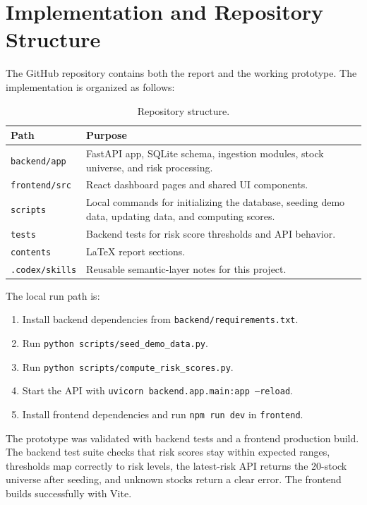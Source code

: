 \section{Implementation and Repository Structure}
\label{sec:implementation}

The GitHub repository contains both the report and the working prototype. The implementation is organized as follows:

\begin{table}[H]
\centering
\begin{tabular}{p{} p{}}
\toprule
\textbf{Path} & \textbf{Purpose} \\
\midrule
\texttt{backend/app} & FastAPI app, SQLite schema, ingestion modules, stock universe, and risk processing. \\
\texttt{frontend/src} & React dashboard pages and shared UI components. \\
\texttt{scripts} & Local commands for initializing the database, seeding demo data, updating data, and computing scores. \\
\texttt{tests} & Backend tests for risk score thresholds and API behavior. \\
\texttt{contents} & LaTeX report sections. \\
\texttt{.codex/skills} & Reusable semantic-layer notes for this project. \\
\bottomrule
\end{tabular}
\caption{Repository structure.}
\label{tab:repo-structure}
\end{table}

The local run path is:

\begin{enumerate}
    \item Install backend dependencies from \texttt{backend/requirements.txt}.
    \item Run \texttt{python scripts/seed\_demo\_data.py}.
    \item Run \texttt{python scripts/compute\_risk\_scores.py}.
    \item Start the API with \texttt{uvicorn backend.app.main:app --reload}.
    \item Install frontend dependencies and run \texttt{npm run dev} in \texttt{frontend}.
\end{enumerate}

The prototype was validated with backend tests and a frontend production build. The backend test suite checks that risk scores stay within expected ranges, thresholds map correctly to risk levels, the latest-risk API returns the 20-stock universe after seeding, and unknown stocks return a clear error. The frontend builds successfully with Vite.
